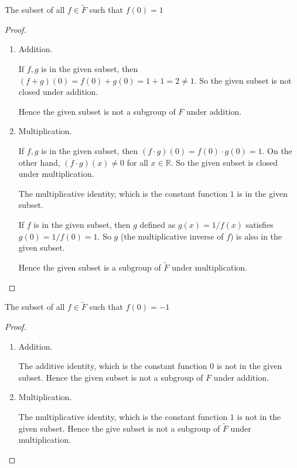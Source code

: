 \begin{exercise}
    The subset of all $f\in\tilde{F}$ such that $f(0) = 1$
\end{exercise}

\begin{proof}
    \begin{enumerate}[label={(\alph*)}]
        \item Addition.

              If $f, g$ is in the given subset, then $(f + g)(0) = f(0) + g(0) = 1 + 1 = 2\ne 1$. So the given subset is not closed under addition.

              Hence the given subset is not a subgroup of $F$ under addition.
        \item Multiplication.

              If $f, g$ is in the given subset, then $(f\cdot g)(0) = f(0)\cdot g(0) = 1$. On the other hand, $(f\cdot g)(x) \ne 0$ for all $x\in\mathbb{R}$. So the given subset is closed under multiplication.

              The multiplicative identity, which is the constant function $1$ is in the given subset.

              If $f$ is in the given subset, then $g$ defined as $g(x) = 1/f(x)$ satisfies $g(0) = 1/f(0) = 1$. So $g$ (the multiplicative inverse of $f$) is also in the given subset.

              Hence the given subset is a subgroup of $\tilde{F}$ under multiplication.
    \end{enumerate}
\end{proof}

\begin{exercise}
    The subset of all $f\in\tilde{F}$ such that $f(0) = -1$
\end{exercise}

\begin{proof}
    \begin{enumerate}[label={(\alph*)}]
        \item Addition.

              The additive identity, which is the constant function $0$ is not in the given subset. Hence the given subset is not a subgroup of $F$ under addition.
        \item Multiplication.

              The multiplicative identity, which is the constant function $1$ is not in the given subset. Hence the give subset is not a subgroup of $\tilde{F}$ under multiplication.
    \end{enumerate}
\end{proof}

